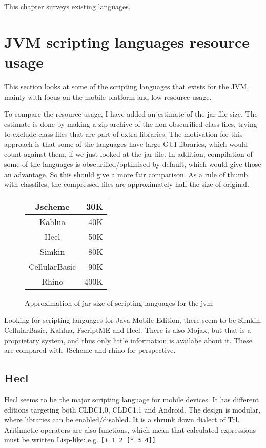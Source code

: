 This chapter surveys existing languages.

\section{JVM scripting languages resource usage}
This section looks at some of the scripting languages that exists for the JVM,
mainly with focus on the mobile platform and low resource usage.

To compare the resource usage, I have added an estimate of the jar file size. 
The estimate is done by making a zip archive of the non-obscurified class files,
trying to exclude class files that are part of extra libraries.
The motivation for this approach is that some of the languages have large GUI libraries,
which would count against them, if we just looked at the jar file. 
In addition, compilation of some of the languages is obscurified/optimised by default,
which would give those an advantage. So this should give a more fair comparison.
As a rule of thumb with classfiles, the compressed files are approximately half the size of original.
 
\begin{figure}
\begin{center}
\begin{tabular}{|c|r|}
\hline 
Jscheme & 30K \\
\hline 
Kahlua & 40K \\
\hline 
Hecl & 50K \\
\hline 
Simkin & 80K \\
\hline 
CellularBasic & 90K \\
\hline 
Rhino & 400K \\
\hline 
\end{tabular}
\end{center}
\caption{Approximation of jar size of scripting languages for the jvm}
\end{figure}

Looking for scripting languages for Java Mobile Edition, there seem to be Simkin, CellularBasic, Kahlua, FscriptME and Hecl. There is also Mojax, but that is a proprietary system, and thus only little information is availabe about it.
These are compared with JScheme and rhino for perspective.


\subsection{Hecl}
Hecl seems to be the major scripting language for mobile devices.
It has different editions targeting both CLDC1.0, CLDC1.1 and Android.
The design is modular, where libraries can be enabled/disabled.
It is a shrunk down dialect of Tcl. Arithmetic operators are also functions, which mean that calculated expressions must be written Lisp-like: e.g. \verb|[+ 1 2 [* 3 4]]|

